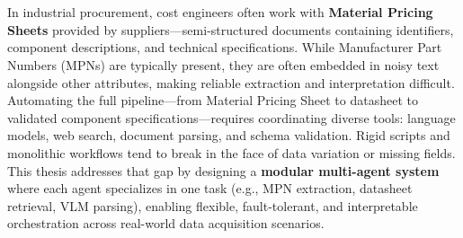\chapter{\abstractname}

In industrial procurement, cost engineers often work with \textbf{Material Pricing Sheets} provided by suppliers—semi-structured documents containing identifiers, component descriptions, and technical specifications. While Manufacturer Part Numbers (MPNs) are typically present, they are often embedded in noisy text alongside other attributes, making reliable extraction and interpretation difficult. Automating the full pipeline—from Material Pricing Sheet to datasheet to validated component specifications—requires coordinating diverse tools: language models, web search, document parsing, and schema validation. Rigid scripts and monolithic workflows tend to break in the face of data variation or missing fields. This thesis addresses that gap by designing a \textbf{modular multi-agent system} where each agent specializes in one task (e.g., MPN extraction, datasheet retrieval, VLM parsing), enabling flexible, fault-tolerant, and interpretable orchestration across real-world data acquisition scenarios.

